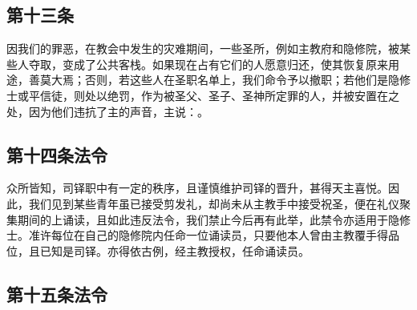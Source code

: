 \subsection{第十三条}

\par

因我们的罪恶，在教会中发生的灾难期间，一些圣所，例如主教府和隐修院，被某些人夺取，变成了公共客栈。如果现在占有它们的人愿意归还，使其恢复原来用途，善莫大焉；否则，若这些人在圣职名单上，我们命令予以撤职；若他们是隐修士或平信徒，则处以绝罚，作为被圣父、圣子、圣神所定罪的人，并被安置在之处，因为他们违抗了主的声音，主说：。\par

\par


\subsection{第十四条法令}

\par

众所皆知，司铎职中有一定的秩序，且谨慎维护司铎的晋升，甚得天主喜悦。因此，我们见到某些青年虽已接受剪发礼，却尚未从主教手中接受祝圣，便在礼仪聚集期间的上诵读，且如此违反法令，我们禁止今后再有此举，此禁令亦适用于隐修士。准许每位在自己的隐修院内任命一位诵读员，只要他本人曾由主教覆手得品位，且已知是司铎。亦得依古例，经主教授权，任命诵读员。\par

\par


\subsection{第十五条法令}

